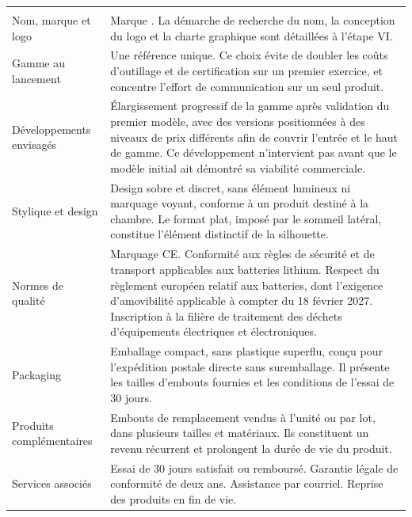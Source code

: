 \begin{center}
\begin{xltabular}{\textwidth}{P{4cm}L}
\toprule
{} &  \\
\midrule
\endfirsthead
\toprule
{} &  \\
\midrule
\endhead

Nom, marque et logo
&
Marque \nomentreprise{}. La démarche de recherche du nom, la conception du logo
et la charte graphique sont détaillées à l'étape VI. \\

Gamme au lancement
&
Une référence unique. Ce choix évite de doubler les coûts d'outillage et de
certification sur un premier exercice, et concentre l'effort de communication
sur un seul produit. \\

Développements envisagés
&
Élargissement progressif de la gamme après validation du premier modèle, avec
des versions positionnées à des niveaux de prix différents afin de couvrir
l'entrée et le haut de gamme. Ce développement n'intervient pas avant que le
modèle initial ait démontré sa viabilité commerciale. \\

Stylique et design
&
Design sobre et discret, sans élément lumineux ni marquage voyant, conforme à un
produit destiné à la chambre. Le format plat, imposé par le sommeil latéral,
constitue l'élément distinctif de la silhouette. \\

Normes de qualité
&
Marquage CE. Conformité aux règles de sécurité et de transport applicables aux
batteries lithium. Respect du règlement européen relatif aux batteries, dont
l'exigence d'amovibilité applicable à compter du 18 février 2027. Inscription à
la filière de traitement des déchets d'équipements électriques et
électroniques. \\

Packaging
&
Emballage compact, sans plastique superflu, conçu pour l'expédition postale
directe sans suremballage. Il présente les tailles d'embouts fournies et les
conditions de l'essai de 30 jours. \\

Produits complémentaires
&
Embouts de remplacement vendus à l'unité ou par lot, dans plusieurs tailles et
matériaux. Ils constituent un revenu récurrent et prolongent la durée de vie du
produit. \\

Services associés
&
Essai de 30 jours satisfait ou remboursé. Garantie légale de conformité de deux
ans. Assistance par courriel. Reprise des produits en fin de vie. \\
\bottomrule
\end{xltabular}
\end{center}

